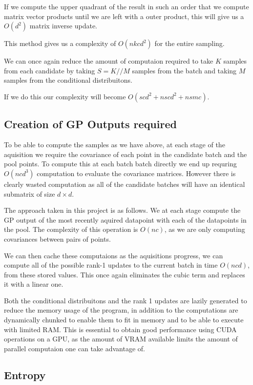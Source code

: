 \documentclass[12pt, a4paper]{report}
\theoremstyle{definition}
\theoremstyle{definition}
\theoremstyle{definition}
\begin{document}
If we compute the upper quadrant of the result in such an order that we compute matrix vector products until we are left with a outer product, this will give us a $O(d^2)$ matrix inverse update.


This method gives us a complexity of  $O\left(nkcd^2 \right)$ for the entire sampling.


We can once again reduce the amount of computaion required to take $K$ samples from each candidate by taking $S = K // M$ samples from the batch and taking $M$ samples from the conditional distribuitons.


If we do this our complexity will become $O\left(scd^2 + nscd^2 + nsmc\right)$.

\subsection{Creation of GP Outputs required}

To be able to compute the samples as we have above, at each stage of the aquisition we require the covariance of each point in the candidate batch and the pool points. To compute this at each batch batch directly we end up requring $O(ncd^3)$ computation to evaluate the covariance matrices. However there is clearly wasted computation as all of the candidate batches will have an identical submatrix of size $d \times d$.

The approach taken in this project is as follows. We at each stage compute the GP output of the most recently aquired datapoint with each of the datapoints in the pool. The complexity of this operation is $O(nc)$, as we are only computing covariances between pairs of points.

We can then cache these computaions as the aquisitions progress, we can compute all of the possible rank-1 updates to the current batch in time $O(ncd)$, from these stored values. This once again eliminates the cubic term and replaces it with a linear one.


Both the conditional distribuitons and the rank 1 updates are lazily generated to reduce the memory usage of the program, in addition to the computations are dynamically chunked to enable them to fit in memory and to be able to execute with limited RAM. This is essential to obtain good performance using CUDA operations on a GPU, as the amount of VRAM available limits the amount of parallel computaion one can take advantage of.

\subsection{Entropy}
\end{document}
